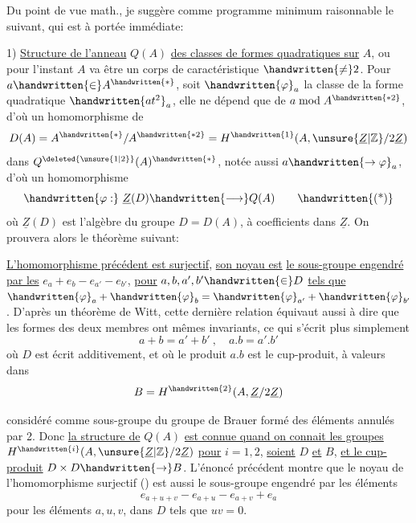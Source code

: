  Du point de vue math., je suggère comme programme minimum raisonnable le suivant, qui est à portée immédiate:

1) \uline{Structure de l'anneau} $Q(A)$ \uline{des classes de formes quadratiques sur} $A$, ou pour l'instant $A$ va être un corps de caractéristique $\handwritten{\ne}2$. Pour $a\handwritten{\in}A^{\handwritten{*}}$, soit $\handwritten{\varphi}_a$ la classe de la forme quadratique $\handwritten{at^2}_{a}$, elle ne dépend que de $a\bmod A^{\handwritten{*2}}$, d'où un homomorphisme de
\[
D(A)=A^{\handwritten{*}}/A^{\handwritten{*2}}=H^{\handwritten{1}}(A,\unsure{\underline{Z}|\mathbb{Z}}/2\underline{Z})
\]
dans $Q^{\deleted{\unsure{1|2}}}(A)^{\handwritten{*}}$, notée aussi $a\handwritten{\to\varphi}_a$, d'où un homomorphisme
\[
\handwritten{\varphi:}\ \underline{Z}(D)\handwritten{\longrightarrow}Q(A)
\tag*{\handwritten{(*)}}
\]
où $\underline{Z}(D)$ est l'algèbre du groupe $D=D(A)$, à coefficients dans $\underline{Z}$. On prouvera alors le théorème suivant:

\uline{L'homomorphisme précédent est surjectif}, \uline{son noyau est}  \uline{le sous-groupe engendré par les} $e_a+e_b-e_{a'}-e_{b'}$, \uline{pour} $a,b,a',b'\handwritten{\in}D$ \uline{tels que} $\handwritten{\varphi}_a+\handwritten{\varphi}_b=\handwritten{\varphi}_{a'}+\handwritten{\varphi}_{b'}$. D'après un théorème de Witt, cette dernière relation équivaut aussi à dire que les formes des deux membres ont mêmes invariants, ce qui s'écrit plus simplement
\reversemarginpar
{}
\normalmarginpar
\[
a+b=a'+b'\ ,\quad a.b=a'.b'
\]
où $D$ est écrit additivement, et où le produit $a.b$ est le cup-produit, à valeurs dans
\[
B=H^{\handwritten{2}}(A,\underline{Z}/2\underline{Z})
\]

considéré comme sous-groupe du groupe de Brauer formé des éléments annulés par 2. Donc \uline{la structure de} $Q(A)$ \uline{est connue quand on connait les groupes} $H^{\handwritten{i}}(A,\unsure{\underline{Z}|\mathbb{Z}}/2\underline{Z})$ \uline{pour} $i=1,2$, \uline{soient} $D$ \uline{et} $B$, \uline{et le cup-produit} $D\times D\handwritten{\to}B$. L'énoncé précédent montre  que le noyau de l'homomorphisme surjectif (\handwritten{*}) est aussi le sous-groupe engendré par les éléments
\[
e_{a+u+v}-e_{a+u}-e_{a+v}+e_a
\]
pour les éléments $a,u,v$, dans $D$ tels que $uv=0$.

